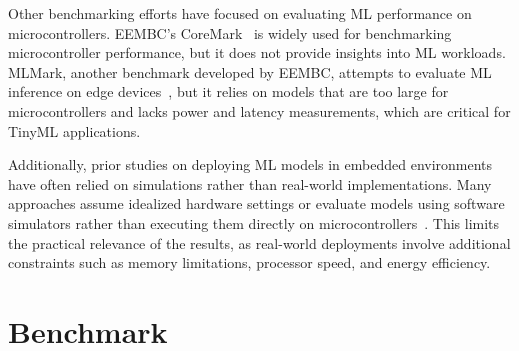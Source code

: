 \documentclass[conference]{IEEEtran}
\begin{document}
Other benchmarking efforts have focused on evaluating ML performance on microcontrollers. {EEMBC's CoreMark}~\cite{coremark2009} is widely used for benchmarking microcontroller performance, but it does not provide insights into ML workloads. {MLMark}, another benchmark developed by EEMBC, attempts to evaluate ML inference on edge devices~\cite{mlmark2020}, but it relies on models that are too large for microcontrollers and lacks power and latency measurements, which are critical for TinyML applications.

Additionally, prior studies on deploying ML models in embedded environments have often relied on {simulations} rather than real-world implementations. Many approaches assume idealized hardware settings or evaluate models using software simulators rather than executing them directly on microcontrollers~\cite{fedorov2019sparse}. This limits the practical relevance of the results, as real-world deployments involve additional constraints such as memory limitations, processor speed, and energy efficiency.

\begin{table*}[!htbp]
    \centering
    \vspace{0.6em}
    \caption{Overall results for each scenario.}
    \label{tab:img}
\end{table*}


\section{Benchmark}
\end{document}
